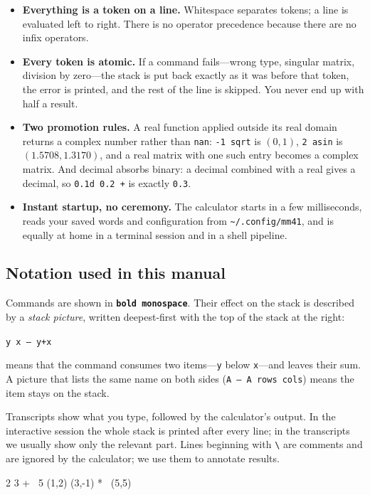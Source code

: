\documentclass[11pt,letterpaper]{article}
\newcommand{\code}[1]{\texttt{#1}}
\newcommand{\cmd}[1]{\texttt{\textbf{#1}}}
\newcommand{\stk}[1]{\texttt{#1}}
\begin{document}
\begin{itemize}
  \item \textbf{Everything is a token on a line.} Whitespace separates tokens; a line is evaluated left to right. There is no operator precedence because there are no infix operators.
  \item \textbf{Every token is atomic.} If a command fails---wrong type, singular matrix, division by zero---the stack is put back exactly as it was before that token, the error is printed, and the rest of the line is skipped. You never end up with half a result.
  \item \textbf{Two promotion rules.} A real function applied outside its real domain returns a complex number rather than \code{nan}: \code{-1 sqrt} is $(0,1)$, \code{2 asin} is $(1.5708, 1.3170)$, and a real matrix with one such entry becomes a complex matrix. And decimal absorbs binary: a decimal combined with a real gives a decimal, so \code{0.1d 0.2 +} is exactly \code{0.3}.
  \item \textbf{Instant startup, no ceremony.} The calculator starts in a few milliseconds, reads your saved words and configuration from \code{\textasciitilde/.config/mm41}, and is equally at home in a terminal session and in a shell pipeline.
\end{itemize}

\subsection{Notation used in this manual}

Commands are shown in \cmd{bold monospace}. Their effect on the stack is described by a \emph{stack picture}, written deepest-first with the top of the stack at the right:
\begin{center}\stk{y x -- y+x}\end{center}
means that the command consumes two items---\code{y} below \code{x}---and leaves their sum. A picture that lists the same name on both sides (\stk{A -- A rows cols}) means the item stays on the stack.

Transcripts show what you type, followed by the calculator's output. In the interactive session the whole stack is printed after every line; in the transcripts we usually show only the relevant part. Lines beginning with \code{\textbackslash} are comments and are ignored by the calculator; we use them to annotate results.

\begin{rpn}
2 3 +            \ 5
(1,2) (3,-1) *   \ (5,5)
\end{rpn}
\end{document}
